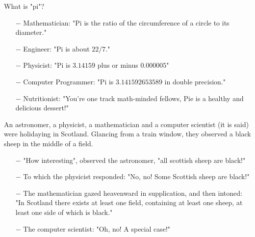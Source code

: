 	\begin{center}\underline{\hspace{5 cm}}\end{center}
	
What is "pi"?

\begin{itemize}	 
	\item[$-$] Mathematician: "Pi is the ratio of the circumference of a circle to its diameter."

	\item[$-$] Engineer: "Pi is about $22/7$."

	\item[$-$] Physicist: "Pi is $3.14159$ plus or minus $0.000005$"

	\item[$-$] Computer Programmer: "Pi is $3.141592653589$ in double precision."

	\item[$-$] Nutritionist: "You're one track math-minded fellows, Pie is a healthy and delicious dessert!"
\end{itemize}
	\begin{center}\underline{\hspace{5 cm}}\end{center}
	
An astronomer, a physicist, a mathematician and a computer scientist (it is said) were holidaying in Scotland. Glancing from a train window, they observed a black sheep in the middle of a field. 

\begin{itemize}	 
	\item[$-$] "How interesting", observed the astronomer, "all scottish sheep are black!" 

	\item[$-$] To which the physicist responded: "No, no! Some Scottish sheep are black!" 

	\item[$-$] The mathematician gazed heavenward in supplication, and then intoned: "In Scotland there exists at least one field, containing at least one sheep, at least one side of which is black."

	\item[$-$] The computer scientist: "Oh, no! A special case!"	
	
\end{itemize}
	\begin{center}\underline{\hspace{5 cm}}\end{center}	
	
